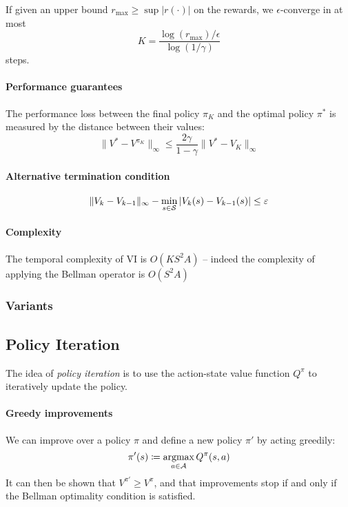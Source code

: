 \documentclass[../course-notes.tex]{subfiles}
\begin{document}
\begin{prop}
	If given an upper bound $r_{\max{}} \geq \sup |r(\cdot)|$ on the rewards, we $\epsilon$-converge in at most
	\[
		K = \frac{\log(r_{\max{}})/\epsilon}{\log(1/\gamma)}
	\]
	steps.
\end{prop}

\paragraph{Performance guarantees} The performance loss between the final policy $\pi_K$ and the optimal policy $\pi^*$ is measured by the distance between their values:
\[
	\|V^* - V^{\pi_K}\|_\infty \leq
	\frac{2\gamma}{1 - \gamma} \| V^* - V_K\|_\infty
\]

\paragraph{Alternative termination condition}
\[
	\|V_k-V_{k-1}\|_\infty -
	\min_{s\in\mathcal{S}} |V_k(s) - V_{k-1}(s)| \leq \varepsilon
\]

\paragraph{Complexity} The temporal complexity of VI is $O(KS^2A)$ -- indeed the complexity of applying the Bellman operator is $O(S^2A)$



\subsubsection{Variants}






\subsection{Policy Iteration}

The idea of \textit{policy iteration} is to use the action-state value function $Q^\pi$ to iteratively update the policy.

\paragraph{Greedy improvements} We can improve over a policy $\pi$ and define a new policy $\pi'$ by acting greedily:
\[
	\pi'(s) \coloneqq \operatorname*{\mathrm{argmax}}_{a\in\mathcal{A}} Q^\pi(s,a)
\]
It can then be shown that $V^{\pi'} \geq V^{\pi}$, and that improvements stop if and only if the Bellman optimality condition is satisfied.
\end{document}
